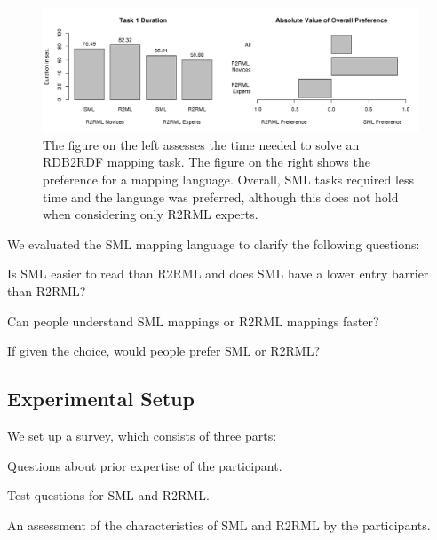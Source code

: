 \begin{figure}[!t]
\includegraphics[width=\textwidth]{pics/time_n_pref}
\caption{The figure on the left assesses the time needed to solve an RDB2RDF mapping task. The figure on the right shows the preference for a mapping language. Overall, SML tasks required less time and the language was preferred, although this does not hold when considering only R2RML experts.}
\label{fig:time_n_pref}
\end{figure}


We evaluated the SML mapping language to clarify the following questions:

\begin{compactenum}
 \item Is SML easier to read than R2RML and does SML have a lower entry barrier than R2RML?
 \item Can people understand SML mappings or R2RML mappings faster?
 \item If given the choice, would people prefer SML or R2RML?
\end{compactenum}

\subsection{Experimental Setup}

We set up a survey, which consists of three parts:

\begin{compactenum}
 \item Questions about prior expertise of the participant.
 \item Test questions for SML and R2RML.
 \item An assessment of the characteristics of SML and R2RML by the participants.
\end{compactenum}


